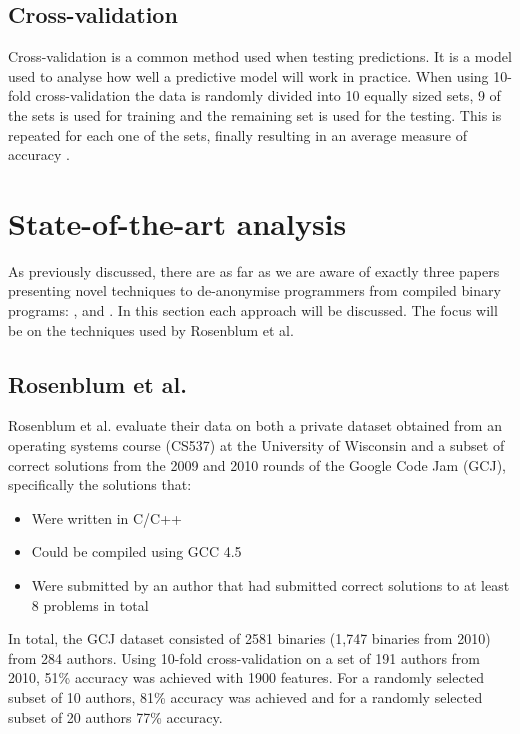 \documentclass[a4paper,11pt]{kth-mag}
\begin{document}
\subsection{Cross-validation}
Cross-validation is a common method used when testing predictions. It is a
model used to analyse how well a predictive model will work in practice. When
using 10-fold cross-validation the data is randomly divided into 10 equally
sized sets, 9 of the sets is used for training and the remaining set is used
for the testing. This is repeated for each one of the sets, finally resulting
in an average measure of accuracy \parencite{hsu2003practical}.        

\section{State-of-the-art analysis}
As previously discussed, there are as far as we are aware of exactly three
papers presenting novel techniques to de-anonymise programmers from compiled
binary programs: \parencite{rosenblum2011wrote}, \parencite{alrabaee2014oba2}
and \parencite{caliskan2015coding}. In this section each approach will be discussed.
The focus will be on the techniques used by Rosenblum et al.

\subsection{Rosenblum et al.}
Rosenblum et al. evaluate their data on both a private dataset obtained from
an operating systems course (CS537) at the University of Wisconsin and a subset
of correct solutions from the 2009 and 2010 rounds of the Google Code Jam
(GCJ), specifically the solutions that:

\begin{itemize}
\item Were written in C/C++
\item Could be compiled using GCC 4.5 
\item Were submitted by an author that had submitted correct solutions to at
      least 8 problems in total
\end{itemize}

In total, the GCJ dataset consisted of 2581 binaries (1,747 binaries from
2010) from 284 authors. Using 10-fold cross-validation on a set of 191 authors
from 2010, 51\% accuracy was achieved with 1900 features. For a randomly selected subset of 10
authors, 81\% accuracy was achieved and for a randomly selected subset of 20
authors 77\% accuracy.
\end{document}
